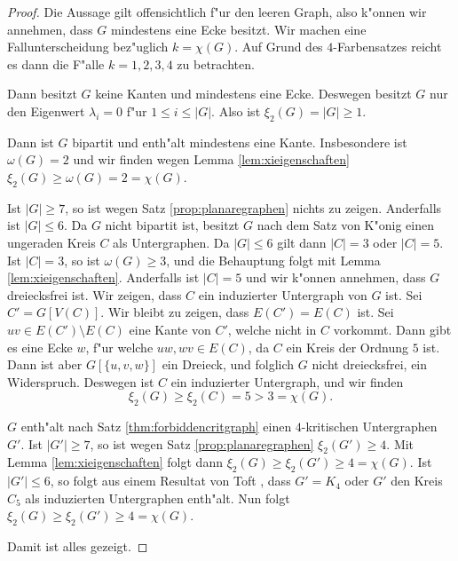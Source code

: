 \begin{proof}
  Die Aussage gilt offensichtlich f"ur den leeren Graph, also k"onnen wir annehmen, dass $G$ mindestens eine Ecke besitzt.
  Wir machen eine Fallunterscheidung bez"uglich $k=\chi(G)$. Auf Grund des $4$-Farbensatzes reicht es dann die F"alle $k=1,2,3,4$ zu betrachten.
  
   Dann besitzt $G$ keine Kanten und mindestens eine Ecke. Deswegen besitzt $G$ nur den Eigenwert $\lambda_i = 0$ f"ur $1 \leq i \leq |G|$. Also ist $\xi_{2}(G) = |G| \geq 1$.

   Dann ist $G$ bipartit und enth"alt mindestens eine Kante. Insbesondere ist $\omega(G) = 2$ und wir finden wegen Lemma \ref{lem:xieigenschaften} $\xi_{2}(G) \geq \omega(G) = 2 = \chi(G)$.

   Ist $|G| \geq 7$, so ist wegen Satz \ref{prop:planaregraphen} nichts zu zeigen. Anderfalls ist $|G| \leq 6$. Da $G$ nicht bipartit ist, besitzt $G$ nach dem Satz von K"onig einen ungeraden Kreis $C$ als Untergraphen. Da $|G| \leq 6$ gilt dann $|C| = 3$ oder  $|C| = 5$.
  Ist $|C| = 3$, so ist $\omega(G) \geq 3$, und die Behauptung folgt mit Lemma \ref{lem:xieigenschaften}. 
  Anderfalls ist $|C| = 5$ und wir k"onnen annehmen, dass $G$ dreiecksfrei ist. Wir zeigen, dass $C$ ein induzierter Untergraph von $G$ ist. Sei $C' = G[V(C)]$. Wir bleibt zu zeigen, dass $E(C') = E(C)$ ist. Sei $uv\in E(C')\setminus E(C)$ eine Kante von $C'$, welche nicht in $C$ vorkommt. 
  Dann gibt es eine Ecke $w$, f"ur welche $uw,wv\in E(C)$, da $C$ ein Kreis der Ordnung $5$ ist. Dann ist aber $G[\{u,v,w\}]$ ein Dreieck, und folglich $G$ nicht dreiecksfrei, ein Widerspruch.
  Deswegen ist $C$ ein induzierter Untergraph, und wir finden
  $$\xi_{2}(G) \geq \xi_{2}(C) = 5 > 3 = \chi(G).$$

   $G$ enth"alt nach Satz \ref{thm:forbiddencritgraph} einen $4$-kritischen Untergraphen $G'$. Ist $|G'| \geq 7$, so ist wegen Satz \ref{prop:planaregraphen} $\xi_{2}(G') \geq 4$. Mit Lemma \ref{lem:xieigenschaften} folgt dann $\xi_{2}(G) \geq \xi_{2}(G') \geq 4 = \chi(G)$.
  Ist $|G'| \leq 6$, so folgt aus einem Resultat von Toft \cite{Toft74b}, dass $G' = K_4$ oder $G'$ den Kreis $C_5$ als induzierten Untergraphen enth"alt. Nun folgt $\xi_{2}(G) \geq \xi_{2}(G') \geq 4 = \chi(G)$. 

  Damit ist alles gezeigt.
\end{proof}

